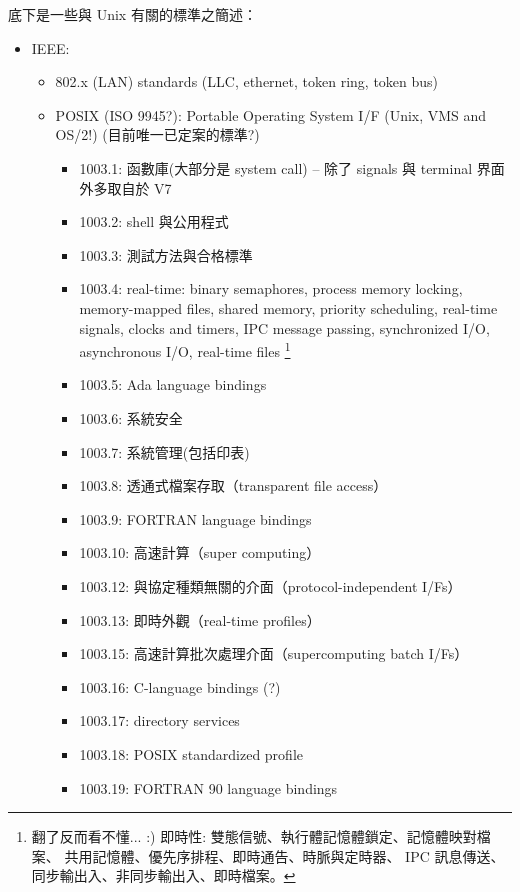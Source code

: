 \documentclass{article}
\begin{document}
\begin{CJK*}{Bg5}{ming}
     底下是一些與 Unix 有關的標準之簡述：

\begin{itemize}
      \item IEEE:
      \begin{itemize}
        \item 802.x (LAN) standards (LLC, ethernet, token ring, token bus)
        \item  POSIX (ISO 9945?): Portable Operating System I/F (Unix, VMS
          and OS/2!) (目前唯一已定案的標準?)
        \begin{itemize}
          \item 1003.1:  函數庫(大部分是 system call) -- 除了 signals 與 
		     terminal 界面外多取自於 V7
          \item 1003.2:  shell 與公用程式
          \item 1003.3:  測試方法與合格標準
          \item 1003.4:  real-time: binary semaphores, process memory
                     locking, memory-mapped files, shared memory,
                     priority scheduling, real-time signals, clocks and
                     timers, IPC message passing, synchronized I/O,
                     asynchronous I/O, real-time files
                     \footnote{翻了反而看不懂... :)
                     即時性: 雙態信號、執行體記憶體鎖定、記憶體映對檔案、
                     共用記憶體、優先序排程、即時通告、時脈與定時器、
                     IPC 訊息傳送、同步輸出入、非同步輸出入、即時檔案。}
          \item 1003.5:  Ada language bindings
          \item 1003.6:  系統安全
          \item 1003.7:  系統管理(包括印表)
          \item 1003.8:  透通式檔案存取（transparent file access）
          \item 1003.9:  FORTRAN language bindings
          \item 1003.10: 高速計算（super computing）
          \item 1003.12: 與協定種類無關的介面（protocol-independent I/Fs）
          \item 1003.13: 即時外觀（real-time profiles）
          \item 1003.15: 高速計算批次處理介面（supercomputing batch I/Fs）
          \item 1003.16: C-language bindings (?)
          \item 1003.17: directory services
          \item 1003.18: POSIX standardized profile
          \item 1003.19: FORTRAN 90 language bindings
        \end{itemize}
      \end{itemize}


\end{itemize}
\end{CJK*}
\end{document}
